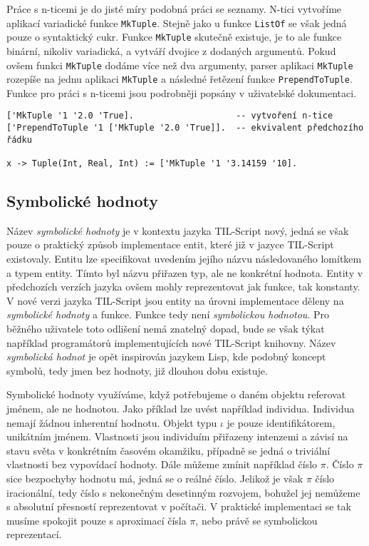 Práce s n-ticemi je do jisté míry podobná práci se seznamy. N-tici vytvoříme aplikací variadické
funkce \lstinline{MkTuple}. Stejně jako u funkce \lstinline{ListOf} se však jedná pouze o
syntaktický cukr. Funkce \lstinline{MkTuple} skutečně existuje, je to ale funkce binární, nikoliv
variadická, a vytváří dvojice z dodaných argumentů. Pokud ovšem funkci \lstinline{MkTuple} dodáme
více než dva argumenty, parser aplikaci \lstinline{MkTuple} rozepíše na jednu aplikaci
\lstinline{MkTuple} a následné řetězení funkce \lstinline{PrependToTuple}. Funkce pro práci
s n-ticemi jsou podrobněji popsány v uživatelské dokumentaci.
 
\begin{lstlisting}[caption={Příklad využití n-tic}]
['MkTuple '1 '2.0 'True].                    -- vytvoření n-tice
['PrependToTuple '1 ['MkTuple '2.0 'True]].  -- ekvivalent předchozího řádku

x -> Tuple(Int, Real, Int) := ['MkTuple '1 '3.14159 '10].
\end{lstlisting}

\subsection{Symbolické hodnoty}\label{symbolic-values}

Název \textit{symbolické hodnoty} je v kontextu jazyka TIL-Script nový, jedná se však pouze o
praktický způsob implementace entit, které již v jazyce TIL-Script existovaly. Entitu lze
specifikovat uvedením jejího názvu následovaného lomítkem a typem entity. Tímto byl názvu přiřazen
typ, ale ne konkrétní hodnota. Entity v předchozích verzích jazyka ovšem mohly reprezentovat jak
funkce, tak konstanty. V nové verzi jazyka TIL-Script jsou entity na úrovni implementace děleny
na \textit{symbolické hodnoty} a funkce. Funkce tedy není \textit{symbolickou hodnotou}.
Pro běžného uživatele toto odlišení nemá znatelný dopad, bude se však týkat například programátorů
implementujících nové TIL-Script knihovny. Název \textit{symbolická hodnot} je opět inspirován
jazykem Lisp, kde podobný koncept symbolů, tedy jmen bez hodnoty, již dlouhou dobu existuje.

Symbolické hodnoty využíváme, když potřebujeme o daném objektu referovat jménem, ale ne hodnotou.
Jako příklad lze uvést například individua. Individua nemají žádnou inherentní hodnotu. Objekt
typu $\iota$ je pouze identifikátorem, unikátním jménem. Vlastnosti jsou individuím přiřazeny
intenzemi a závisí na stavu světa v konkrétním časovém okamžiku, případně se jedná o triviální
vlastnosti bez vypovídací hodnoty. Dále můžeme zmínit například číslo $\pi$. Číslo $\pi$ sice
bezpochyby hodnotu má, jedná se o reálné číslo. Jelikož je však $\pi$ číslo iracionální, tedy číslo
s nekonečným desetinným rozvojem, bohužel jej nemůžeme s absolutní přesností reprezentovat
v počítači. V praktické implementaci se tak musíme spokojit pouze s aproximací čísla $\pi$, nebo
právě se symbolickou reprezentací.

